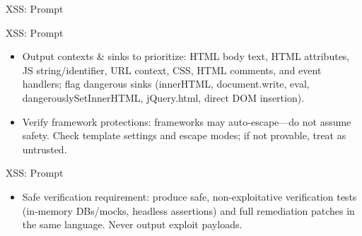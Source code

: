 \documentclass[t,ignorenonframetext]{beamer}
\begin{document}
\begin{frame}{XSS: Prompt}
\end{frame}

\begin{frame}{XSS: Prompt}
\begin{tcolorbox}
[colback=blue!5!white,colframe=navy!75!black,title=Tasks (Part 2)]
\begin{itemize}
    \item Output contexts & sinks to prioritize: HTML body text, HTML attributes,
   JS string/identifier, URL context, CSS, HTML comments, and event handlers;
   flag dangerous sinks (innerHTML, document.write, eval, dangerouslySetInnerHTML, jQuery.html, direct DOM insertion).
   \item Verify framework protections: frameworks may auto‑escape—do not assume safety. 
   Check template settings and escape modes; if not provable, treat as untrusted.
    

\end{itemize}
\end{tcolorbox}
\end{frame} 

\begin{frame}{XSS: Prompt}
\begin{tcolorbox}
[colback=blue!5!white,colframe=navy!75!black,title=Tasks (Part 3)]
\begin{itemize}
\item Safe verification requirement: produce safe, non‑exploitative verification tests 
   (in‑memory DBs/mocks, headless assertions) and full remediation patches in the same language. Never output exploit payloads.
\end{itemize}
\end{tcolorbox}
\end{frame} 
\end{document}
